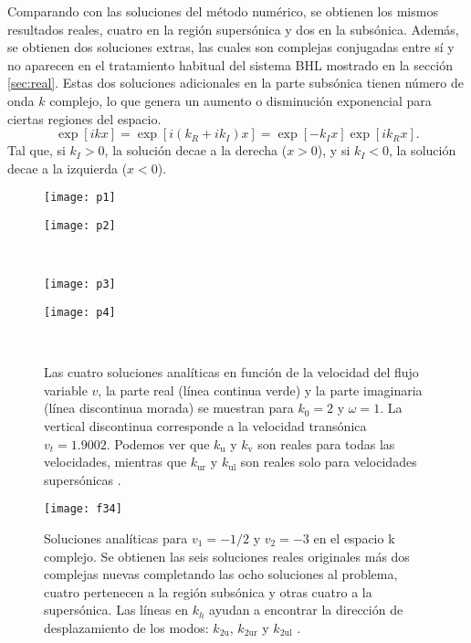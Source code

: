 Comparando con las soluciones del método numérico, se obtienen los mismos resultados reales, cuatro en la región supersónica y dos en la subsónica. Además, se obtienen dos soluciones extras, las cuales son complejas conjugadas entre sí y no aparecen en el tratamiento habitual del sistema BHL mostrado en la secci\'{o}n \ref{sec:real}. Estas dos soluciones adicionales en la parte subsónica tienen n\'{u}mero de onda $k$ complejo, lo que genera un aumento o disminuci\'{o}n exponencial para ciertas regiones del espacio.
\begin{equation}\label{prueba1}
\exp[ikx]=\exp[i(k_R+ik_I)x]=\exp[-k_Ix]\exp[ik_Rx].
\end{equation}
Tal que, si $k_I>0$, la soluci\'{o}n decae a la derecha ($x>0$), y si $k_I<0$, la soluci\'{o}n decae a la izquierda ($x<0$).
\begin{center}
\begin{figure}[h]
\begin{minipage}[c]{0.5\textwidth}
\texttt{[image: p1]}
  \end{minipage}%
\begin{minipage}[c]{0.5\textwidth}
\texttt{[image: p2]}
\end{minipage}\\[20pt]                 
\begin{minipage}[c]{0.5\textwidth}
\texttt{[image: p3]}
  \end{minipage}%
\begin{minipage}[c]{0.5\textwidth}
\texttt{[image: p4]}
\end{minipage}\\[20pt] 
\caption{Las cuatro soluciones analíticas en  funci\'{o}n de la velocidad del flujo variable $v$, la parte real (l\'{i}nea continua verde) y la parte imaginaria (l\'{i}nea discontinua morada) se muestran para $k_0 = 2$ y $\omega=1$. La vertical discontinua corresponde a la velocidad transónica $v_t=1.9002$. Podemos ver que $k_\text{u}$ y $k_\text{v}$ son reales para todas las velocidades, mientras que $k_{\text{ur}}$ y $k_{\text{ul}}$ son reales solo para velocidades supersónicas \citep{2018Bermudez}.}\label{fig:3.4}   
\end{figure}
\end{center}
\begin{figure}[h]
\centering
	\texttt{[image: f34]}
	\caption{Soluciones analíticas para $v_1=-1/2$ y $v_2=-3$ en el espacio k complejo. Se obtienen las seis soluciones reales originales más dos complejas nuevas completando las ocho soluciones al problema, cuatro pertenecen a la regi\'{o}n subs\'{o}nica y otras cuatro a la supers\'{o}nica. Las líneas en $k_h$ ayudan a encontrar la dirección de desplazamiento de los modos: $k_{2\text{u}}$, $k_{2\text{ur}}$ y $k_{2\text{ul}}$ \citep{2018Bermudez}.}\label{fig:3.5}
\end{figure}


